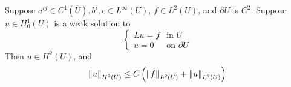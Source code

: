 \documentclass{article}
\begin{document}
\begin{theorem}
    \label{thm:boundary-regularity}
    Suppose \(a^{ij} \in C^1(\overline U), b^i, c \in L^\infty(U)\), \(f \in L^2(U)\), and \(\partial U\) is \(C^2\). Suppose \(u \in H^1_0(U)\) is a weak solution to
    \begin{equation}
        \label{eq:int-reg-elliptic-bvp}
        \begin{cases}
            Lu = f & \text{in }U \\
            u = 0 &\text{on }\partial U
        \end{cases}
    \end{equation}
    Then \(u \in H^2(U)\), and
    \[\norm{u}_{H^2(U)} \le C\left(\norm{f}_{L^2(U)} + \norm{u}_{L^2(U)}\right)\]
\end{theorem}
\end{document}
